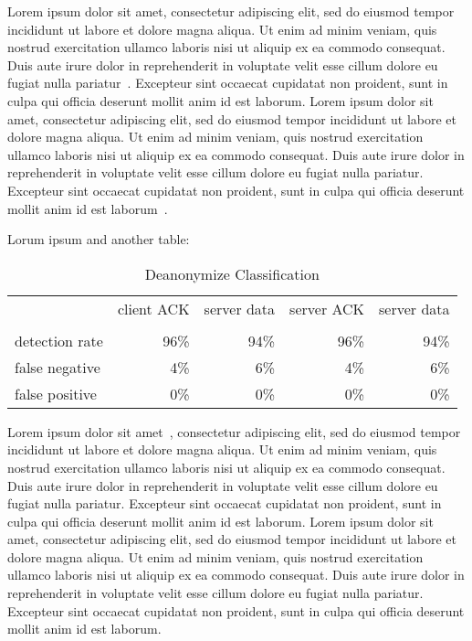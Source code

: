 \documentclass[letterpaper, 10 pt, conference]{ieeeconf}  %
\begin{document}
Lorem ipsum dolor sit amet, consectetur adipiscing elit, sed do eiusmod tempor incididunt ut labore et dolore magna aliqua. Ut enim ad minim veniam, quis nostrud exercitation ullamco laboris nisi ut aliquip ex ea commodo consequat. Duis aute irure dolor in reprehenderit in voluptate velit esse cillum dolore eu fugiat nulla pariatur~\cite{Cite9}. Excepteur sint occaecat cupidatat non proident, sunt in culpa qui officia deserunt mollit anim id est laborum. Lorem ipsum dolor sit amet, consectetur adipiscing elit, sed do eiusmod tempor incididunt ut labore et dolore magna aliqua. Ut enim ad minim veniam, quis nostrud exercitation ullamco laboris nisi ut aliquip ex ea commodo consequat. Duis aute irure dolor in reprehenderit in voluptate velit esse cillum dolore eu fugiat nulla pariatur. Excepteur sint occaecat cupidatat non proident, sunt in culpa qui officia deserunt mollit anim id est laborum~\cite{Cite10}.

Lorum ipsum and another table:

\begin{center}
\begin{table}[ht]
	\caption{Deanonymize Classification}
	\centering
	\begin{tabular}{l r r r r}
		\hline\hline
		\ \ & client  ACK & server data & server ACK & server data \\\\ [0.5ex] 
		\hline
		detection rate&96\%&94\%&96\%&94\% \\
		false negative&4\%&6\%&4\%&6\% \\
		false positive&0\%&0\%&0\% &0\% \\ [1ex]
		\hline
	\end{tabular}
	\label{table:nonlin}
\end{table}
\end{center} 

Lorem ipsum dolor sit amet~\cite{Cite11}, consectetur adipiscing elit, sed do eiusmod tempor incididunt ut labore et dolore magna aliqua. Ut enim ad minim veniam, quis nostrud exercitation ullamco laboris nisi ut aliquip ex ea commodo consequat. Duis aute irure dolor in reprehenderit in voluptate velit esse cillum dolore eu fugiat nulla pariatur. Excepteur sint occaecat cupidatat non proident, sunt in culpa qui officia deserunt mollit anim id est laborum. Lorem ipsum dolor sit amet, consectetur adipiscing elit, sed do eiusmod tempor incididunt ut labore et dolore magna aliqua. Ut enim ad minim veniam, quis nostrud exercitation ullamco laboris nisi ut aliquip ex ea commodo consequat. Duis aute irure dolor in reprehenderit in voluptate velit esse cillum dolore eu fugiat nulla pariatur. Excepteur sint occaecat cupidatat non proident, sunt in culpa qui officia deserunt mollit anim id est laborum.
\end{document}
